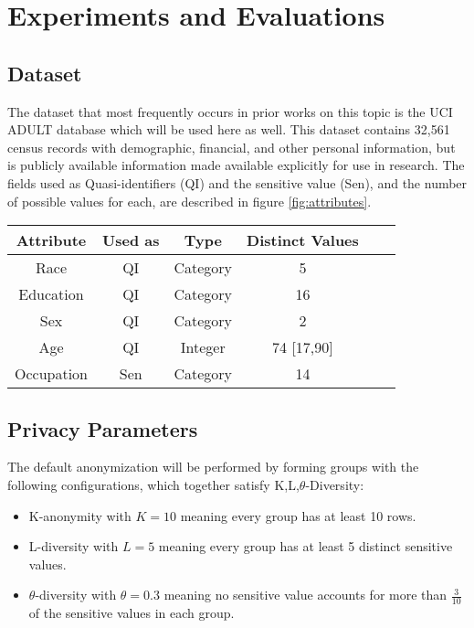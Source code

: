 \section{Experiments and Evaluations}

\subsection{Dataset}
The dataset that most frequently occurs in prior works on this topic is the UCI ADULT database\cite{adultDatabase} which will be used here as well. This dataset contains 32,561 census records with demographic, financial, and other personal information, but is publicly available information made available explicitly for use in research. The fields used as Quasi-identifiers (QI) and the sensitive value (Sen), and the number of possible values for each, are described in figure \ref{fig:attributes}.

\begin{figure*}
\centering
\begin{tabular}{|c||c|c|c|c|c|}
\hline
Attribute & Used as & Type & Distinct Values  \\
\hline
\hline
Race & QI & Category & 5 \\
\hline
Education & QI & Category & 16  \\
\hline
Sex & QI & Category & 2  \\
\hline
Age & QI & Integer & 74 [17,90]  \\
\hline
Occupation & Sen & Category & 14  \\
\hline
\end{tabular}
\caption{Attributes}
\label{fig:attributes}
\end{figure*}

\subsection{Privacy Parameters}
The default anonymization will be performed by forming groups with the following configurations, which together satisfy K,L,$\theta$-Diversity:
\begin{itemize}
    \item K-anonymity with $K=10$ meaning every group has at least 10 rows.
    \item L-diversity with $L=5$ meaning every group has at least 5 distinct sensitive values.
    \item $\theta$-diversity with $\theta=0.3$ meaning no sensitive value accounts for more than $\frac{3}{10}$ of the sensitive values in each group.
\end{itemize}

